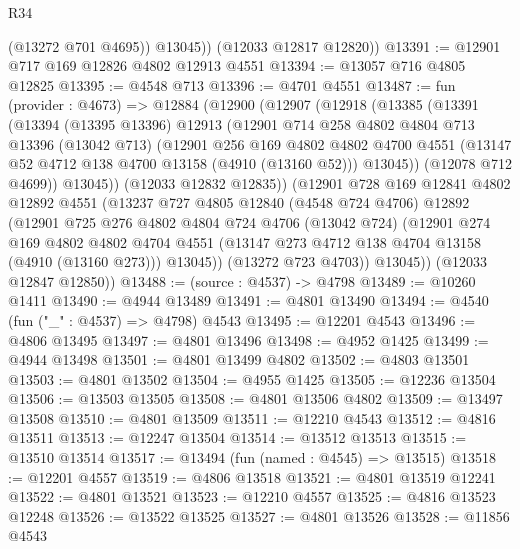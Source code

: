 \begin{lexlean}{R34}
\begin{coremodule}
            (@13272 @701 @4695))
          @13045))
      (@12033 @12817 @12820))
@13391 := @12901 @717 @169 @12826 @4802 @12913 @4551
@13394 := @13057 @716 @4805 @12825
@13395 := @4548 @713
@13396 := @4701 @4551
@13487 := fun (provider : @4673) =>
  @12884
    (@12900
      (@12907
        (@12918
          (@13385
            (@13391
              (@13394
                (@13395 @13396)
                @12913
                (@12901
                  @714
                  @258
                  @4802
                  @4804
                  @713
                  @13396
                  (@13042 @713)
                  (@12901
                    @256
                    @169
                    @4802
                    @4802
                    @4700
                    @4551
                    (@13147 @52 @4712 @138 @4700 @13158 (@4910 (@13160 @52)))
                    @13045))
                (@12078 @712 @4699))
              @13045))
          (@12033 @12832 @12835))
        (@12901
          @728
          @169
          @12841
          @4802
          @12892
          @4551
          (@13237
            @727
            @4805
            @12840
            (@4548 @724 @4706)
            @12892
            (@12901
              @725
              @276
              @4802
              @4804
              @724
              @4706
              (@13042 @724)
              (@12901
                @274
                @169
                @4802
                @4802
                @4704
                @4551
                (@13147 @273 @4712 @138 @4704 @13158 (@4910 (@13160 @273)))
                @13045))
            (@13272 @723 @4703))
          @13045))
      (@12033 @12847 @12850))
@13488 := (source : @4537) -> @4798
@13489 := @10260 @1411
@13490 := @4944 @13489
@13491 := @4801 @13490
@13494 := @4540 (fun ("_" : @4537) => @4798) @4543
@13495 := @12201 @4543
@13496 := @4806 @13495
@13497 := @4801 @13496
@13498 := @4952 @1425
@13499 := @4944 @13498
@13501 := @4801 @13499 @4802
@13502 := @4803 @13501
@13503 := @4801 @13502
@13504 := @4955 @1425
@13505 := @12236 @13504
@13506 := @13503 @13505
@13508 := @4801 @13506 @4802
@13509 := @13497 @13508
@13510 := @4801 @13509
@13511 := @12210 @4543
@13512 := @4816 @13511
@13513 := @12247 @13504
@13514 := @13512 @13513
@13515 := @13510 @13514
@13517 := @13494 (fun (named : @4545) => @13515)
@13518 := @12201 @4557
@13519 := @4806 @13518
@13521 := @4801 @13519 @12241
@13522 := @4801 @13521
@13523 := @12210 @4557
@13525 := @4816 @13523 @12248
@13526 := @13522 @13525
@13527 := @4801 @13526
@13528 := @11856 @4543

\end{coremodule}
\end{lexlean}
